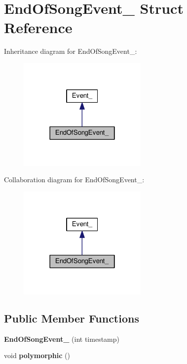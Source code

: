 \hypertarget{struct_end_of_song_event__}{}\section{End\+Of\+Song\+Event\+\_\+ Struct Reference}
\label{struct_end_of_song_event__}


Inheritance diagram for End\+Of\+Song\+Event\+\_\+\+:
\nopagebreak
\begin{figure}[H]
\begin{center}
\leavevmode
\includegraphics[width=178pt]{struct_end_of_song_event____inherit__graph}
\end{center}
\end{figure}


Collaboration diagram for End\+Of\+Song\+Event\+\_\+\+:
\nopagebreak
\begin{figure}[H]
\begin{center}
\leavevmode
\includegraphics[width=178pt]{struct_end_of_song_event____coll__graph}
\end{center}
\end{figure}
\subsection*{Public Member Functions}
\begin{DoxyCompactItemize}
\item 
{\bfseries End\+Of\+Song\+Event\+\_\+} (int timestamp)\hypertarget{struct_end_of_song_event___a2eb0a3904d21226a08e57f30f46fdeb0}{}\label{struct_end_of_song_event___a2eb0a3904d21226a08e57f30f46fdeb0}

\item 
void {\bfseries polymorphic} ()\hypertarget{struct_end_of_song_event___a99543260e4232f18db1f88e3bc551b5c}{}\label{struct_end_of_song_event___a99543260e4232f18db1f88e3bc551b5c}

\end{DoxyCompactItemize}
